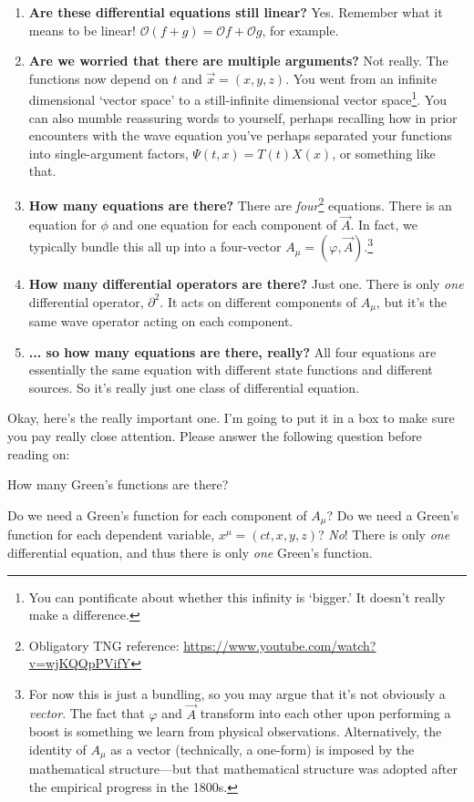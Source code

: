 \begin{enumerate}
\item \textbf{Are these differential equations still linear?} Yes. Remember what it means to be linear! $\mathcal O(f+g) = \mathcal Of +\mathcal Og$, for example.
\item \textbf{Are we worried that there are multiple arguments?} Not really. The functions now depend on $t$ and $\vec{x}=(x,y,z)$. You went from an infinite dimensional `vector space' to a still-infinite dimensional vector space\footnote{You can pontificate about whether this infinity is `bigger.' It doesn't really make a difference.}. You can also mumble reassuring words to yourself, perhaps recalling how in prior encounters with the wave equation you've perhaps separated your functions into single-argument factors, $\Psi(t,x) = T(t)X(x)$, or something like that.
\item \textbf{How many equations are there?} There are \emph{four}\footnote{Obligatory TNG reference: \url{https://www.youtube.com/watch?v=wjKQQpPVifY}} equations. There is an equation for $\phi$ and one equation for each component of $\vec A$. In fact, we typically bundle this all up into a four-vector $A_\mu=(\varphi, \vec A)$.\footnote{For now this is just a bundling, so you may argue that it's not obviously a \emph{vector}. The fact that $\varphi$ and $\vec{A}$ transform into each other upon performing a boost is something we learn from physical observations. Alternatively, the identity of $A_\mu$ as a vector (technically, a one-form) is imposed by the mathematical structure---but that mathematical structure was adopted after the empirical progress in the 1800s.}
\item \textbf{How many differential operators are there?} Just one. There is only \emph{one} differential operator, $\partial^2$. It acts on different components of $A_\mu$, but it's the same wave operator acting on each component. 
\item \textbf{... so how many equations are there, really?} All four equations are essentially the same equation with different state functions and different sources. So it's really just one class of differential equation.
\end{enumerate}
Okay, here's the really important one. I'm going to put it in a box to make sure you pay really close attention. Please answer the following question before reading on:
\begin{framed}
\centering
How many Green's functions are there?
\end{framed}
Do we need a Green's function for each component of $A_\mu$? Do we need a Green's function for each dependent variable, $x^\mu = (ct,x,y,z)$? \emph{No}! There is only \emph{one} differential equation, and thus there is only \emph{one} Green's function. 

